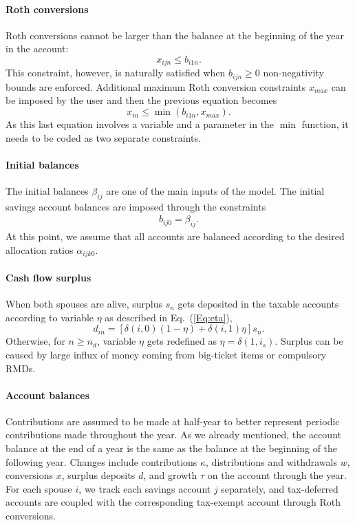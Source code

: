 \documentclass{report}[fleqn,11pt]
\begin{document}
\paragraph*{Roth conversions}
	Roth conversions cannot be larger than the balance at the beginning of the year in the account:
	\begin{equation}
		x_{ijn} \le b_{i1n}.
	\end{equation}
	This constraint, however, is naturally satisfied when $b_{ijn} \ge 0$ non-negativity bounds are enforced.
	Additional maximum Roth conversion constraints $x_{max}$ can be imposed by the user and
	then the previous equation becomes
	\begin{equation}
		x_{in} \le \min(b_{i1n}, x_{max}).
	\end{equation}
	As this last equation involves a variable and a parameter in the $\min$ function,
	it needs to be coded as two separate constraints.

\paragraph*{Initial balances}
	The initial balances $\beta_{ij}$ are one of the main inputs of the model.
	The initial savings account balances are imposed through the constraints
	\begin{eqnarray}
		\label{Eq:InitialBalance}
		b_{ij0} = \beta_{ij}.
	\end{eqnarray}
	At this point, we assume that all accounts are balanced according to the desired
	allocation ratios $\alpha_{ijk0}$.

\paragraph*{Cash flow surplus}
	When both spouses are alive, surplus $s_n$ gets deposited in the taxable accounts
	according to variable $\eta$ as described in Eq.~(\ref{Eq:eta}),
	\begin{equation}
		\label{Eq:eta2}
		d_{in} = [\delta(i, 0)(1 - \eta) + \delta(i, 1)\eta] s_n .
	\end{equation}
	Otherwise, for $n \ge n_d$, variable $\eta$ gets redefined as $\eta = \delta(1, i_s)$.
	Surplus can be caused by large influx of money coming from big-ticket items or compulsory RMDs.

\paragraph*{Account balances}
	Contributions are assumed to be made at half-year to better represent periodic contributions
	made throughout the year. As we already mentioned,
	the account balance at the end of a year is the same as the balance
	at the beginning of the following year.
	Changes include contributions $\kappa$, distributions and withdrawals $w$,
	conversions $x$, surplus deposits $d$, and growth $\tau$ on the account through the year.
	For each spouse $i$, we track each savings account $j$ separately, and tax-deferred accounts
	are coupled with the corresponding tax-exempt account through Roth conversions.
\end{document}
